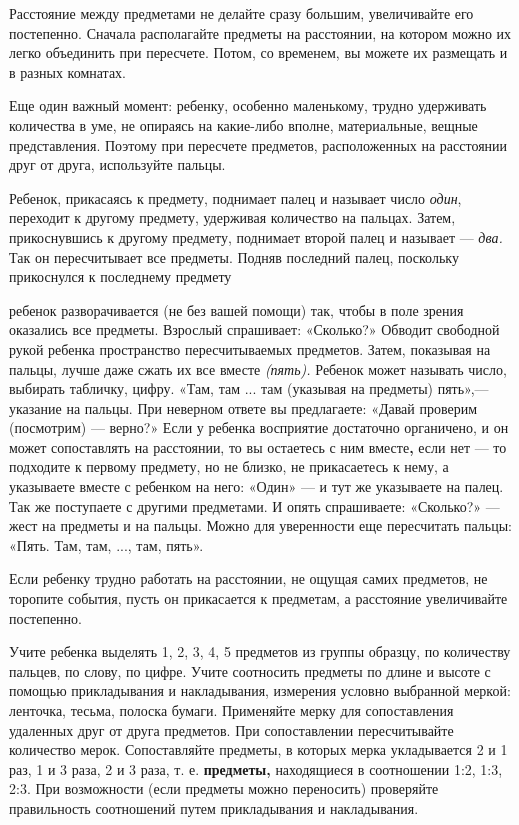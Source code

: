 \documentclass{book}
\renewcommand{\emph}[1]{\textit{#1}}
\begin{document}
Расстояние между предметами не делайте сразу большим, увеличивайте его
постепенно. Сначала располагайте предметы на расстоянии, на котором
можно их легко объединить при пересчете. Потом, со временем, вы можете
их размещать и в разных комнатах.

Еще один важный момент: ребенку, особенно маленькому, трудно удерживать
количества в уме, не опираясь на какие-либо вполне, материальные, вещные
представления. Поэтому при пересчете предметов, расположенных на
расстоянии друг от друга, используйте пальцы.

Ребенок, прикасаясь к предмету, поднимает палец и называет число
\emph{один}, переходит к другому предмету, удерживая количество на
пальцах\textsc{.} Затем, прикоснувшись к другому предмету, поднимает
второй палец и называет --- \emph{два.} Так он пересчитывает все
предметы. Подняв последний палец, поскольку прикоснулся к последнему
предмету

ребенок разворачивается (не без вашей помощи) так, чтобы в поле зрения
оказались все предметы. Взрослый спрашивает: «Сколько?» Обводит
свободной рукой ребенка пространство пересчитываемых предметов. Затем,
показывая на пальцы, лучше даже сжать их все вместе \emph{(пять).}
Ребенок может называть число, выбирать табличку, цифру. «Там, там ...
там (указывая на предметы) пять»,--- указание на пальцы. При неверном
ответе вы предлагаете: «Давай проверим (посмотрим) --- верно?» Если у
ребенка восприятие достаточно органичено, и он может сопоставлять на
расстоянии, то вы остаетесь с ним вместе\textbf{,} если нет --- то
подходите к первому предмету, но не близко, не прикасаетесь к нему, а
указываете вместе с ребенком на него: «Один» --- и тут же указываете на
палец. Так же поступаете с другими предметами. И опять спрашиваете:
«Сколько?» --- жест на предметы и на пальцы. Можно для уверенности еще
пересчитать пальцы: «Пять. Там, там, ..., там, пять».

Если ребенку трудно работать на расстоянии, не ощущая самих предметов,
не торопите события, пусть он прикасается к предметам, а расстояние
увеличивайте постепенно.

Учите ребенка выделять 1, 2, 3, 4, 5 предметов из группы образцу, по
количеству пальцев, по слову, по цифре. Учите соотносить предметы по
длине и высоте с помощью прикладывания и накладывания, измерения условно
выбранной меркой: ленточка, тесьма, полоска бумаги. Применяйте мерку для
сопоставления удаленных друг от друга предметов. При сопоставлении
пересчитывайте количество мерок. Сопоставляйте предметы, в которых мерка
укладывается 2 и 1 раз, 1 и 3 раза, 2 и 3 раза, т. е. \textbf{предметы,}
находящиеся в соотношении 1:2, 1:3, 2:3. При возможности (если предметы
можно переносить) проверяйте правильность соотношений путем
прикладывания и накладывания.
\end{document}

